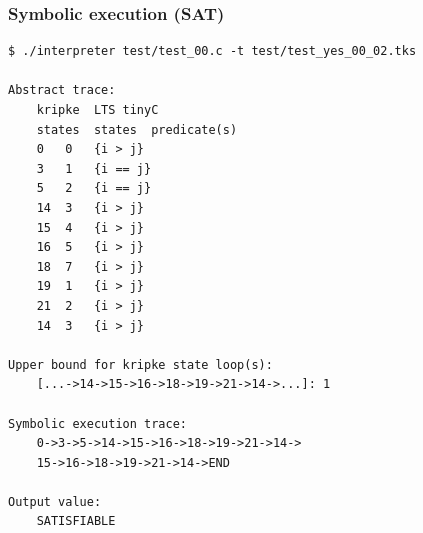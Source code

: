 \documentclass[english,a4paper,oneside]{article}%
\begin{document}
\subsubsection{Symbolic execution (SAT)}
\begin{scriptsize}
\begin{lstlisting}
$ ./interpreter test/test_00.c -t test/test_yes_00_02.tks

Abstract trace:
	kripke	LTS	tinyC
	states	states	predicate(s)
	0	0	{i > j}
	3	1	{i == j}
	5	2	{i == j}
	14	3	{i > j}
	15	4	{i > j}
	16	5	{i > j}
	18	7	{i > j}
	19	1	{i > j}
	21	2	{i > j}
	14	3	{i > j}
										
Upper bound for kripke state loop(s):
	[...->14->15->16->18->19->21->14->...]: 1

Symbolic execution trace:
	0->3->5->14->15->16->18->19->21->14->
	15->16->18->19->21->14->END

Output value:
	SATISFIABLE

\end{lstlisting}
\end{scriptsize}

\newpage
\end{document}
